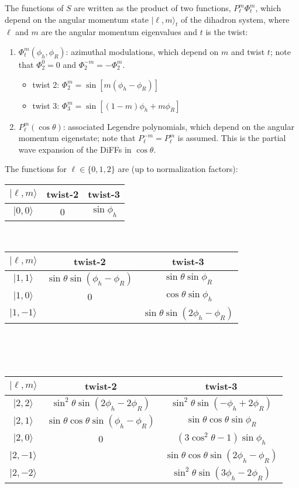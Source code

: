 \documentclass[12pt]{article}
\begin{document}
The functions of $S$ are written as the product of two functions, 
$P_{\ell}^m\Phi_t^m$, which depend
on the angular momentum state $|\ell,m\rangle_t$ of the dihadron system, where
$\ell$ and $m$ are the angular momentum eigenvalues and $t$ is the twist:
\begin{enumerate}
\item $\Phi_t^m\left(\phi_h,\phi_R\right)$: 
azimuthal modulations, which depend on $m$ and twist $t$; note that $\Phi_2^0=0$ and
$\Phi_2^{-m}=-\Phi_2^{m}$.
  \begin{itemize}
  \item twist 2: $\Phi_2^m=\sin\left[m\left(\phi_h-\phi_R\right)\right]$
  \item twist 3: $\Phi_3^m=\sin\left[\left(1-m\right)\phi_h+m\phi_R\right]$
  \end{itemize}
\item $P_{\ell}^{m}\left(\cos\theta\right)$:
associated Legendre polynomials, which depend on the angular momentum
eigenstate; note that $P_{\ell}^{-m}=P_{\ell}^{m}$ is assumed. This is the
partial wave expansion of the DiFFs in $\cos\theta$.
\end{enumerate}
The functions for $\ell\in\{0,1,2\}$ are (up to normalization factors):
\begin{center}
\begin{tabular}{|c|c|c|}
\hline
$|\ell,m\rangle$ & twist-2 & twist-3 \\\hline\hline
$|0,0\rangle$ & 0 & $\sin\phi_h$ \\\hline
\end{tabular}
~ ~ ~
\begin{tabular}{|c|c|c|}
\hline
$|\ell,m\rangle$ & twist-2 & twist-3 \\\hline\hline
$|1,1\rangle$ & $\sin\theta\sin\left(\phi_h-\phi_R\right)$ & $\sin\theta\sin\phi_R$ \\\hline
$|1,0\rangle$ & 0 & $\cos\theta\sin\phi_h$ \\\hline
$|1,-1\rangle$ & $~$ & $\sin\theta\sin\left(2\phi_h-\phi_R\right)$ \\\hline
\end{tabular}
~\\~\\~\\
\begin{tabular}{|c|c|c|}
\hline
$|\ell,m\rangle$ & twist-2 & twist-3 \\\hline\hline
$|2,2\rangle$ & $\sin^2\theta\sin\left(2\phi_h-2\phi_R\right)$ & $\sin^2\theta\sin\left(-\phi_h+2\phi_R\right)$ \\\hline
$|2,1\rangle$ & $\sin\theta\cos\theta\sin\left(\phi_h-\phi_R\right)$ & $\sin\theta\cos\theta\sin\phi_R$ \\\hline
$|2,0\rangle$ & 0 & $\left(3\cos^2\theta-1\right)\sin\phi_h$ \\\hline
$|2,-1\rangle$ & $~$ & $\sin\theta\cos\theta\sin\left(2\phi_h-\phi_R\right)$ \\\hline
$|2,-2\rangle$ & $~$ & $\sin^2\theta\sin\left(3\phi_h-2\phi_R\right)$ \\\hline
\end{tabular}
~\\~\\
\end{center}
\end{document}
